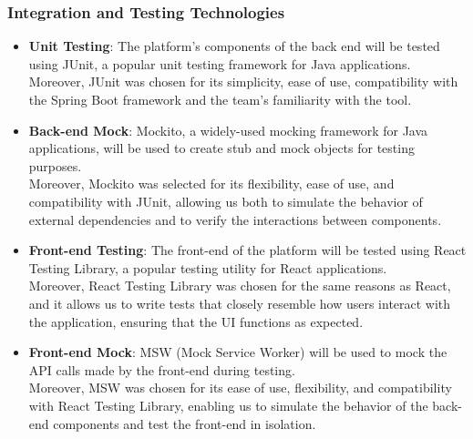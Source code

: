     \subsubsection{Integration and Testing Technologies}
    \begin{itemize}
        \item \textbf{Unit Testing}: The platform's components of the back end will be tested using JUnit, a popular unit testing framework for Java applications.\\
        Moreover, JUnit was chosen for its simplicity, ease of use, compatibility with the Spring Boot framework and the team's familiarity with the tool.
        \item \textbf{Back-end Mock}: Mockito, a widely-used mocking framework for Java applications, will be used to create stub and mock objects for testing purposes.\\
        Moreover, Mockito was selected for its flexibility, ease of use, and compatibility with JUnit, allowing us both to simulate the behavior of external dependencies and to verify the interactions between components.
        \item \textbf{Front-end Testing}: The front-end of the platform will be tested using React Testing Library, a popular testing utility for React applications.\\
        Moreover, React Testing Library was chosen for the same reasons as React, and it allows us to write tests that closely resemble how users interact with the application, ensuring that the UI functions as expected.
        \item \textbf{Front-end Mock}: MSW (Mock Service Worker) will be used to mock the API calls made by the front-end during testing.\\
        Moreover, MSW was chosen for its ease of use, flexibility, and compatibility with React Testing Library, enabling us to simulate the behavior of the back-end components and test the front-end in isolation. 
    \end{itemize}